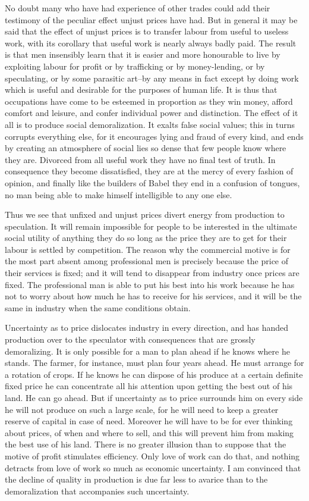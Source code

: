 \documentclass{book}
\begin{document}
No doubt many who have had experience of other trades could add their testimony of the peculiar effect unjust prices have had. But in general it may be said that the effect of unjust prices is to transfer labour from useful to useless work, with its corollary that useful work is nearly always badly paid. The result is that men insensibly learn that it is easier and more honourable to live by exploiting labour for profit or by trafficking or by money-lending, or by speculating, or by some parasitic art–by any means in fact except by doing work which is useful and desirable for the purposes of human life. It is thus that occupations have come to be esteemed in proportion as they win money, afford comfort and leisure, and confer individual power and distinction. The effect of it all is to produce social demoralization. It exalts false social values; this in turns corrupts everything else, for it encourages lying and fraud of every kind, and ends by creating an atmosphere of social lies so dense that few people know where they are. Divorced from all useful work they have no final test of truth. In consequence they become dissatisfied, they are at the mercy of every fashion of opinion, and finally like the builders of Babel they end in a confusion of tongues, no man being able to make himself intelligible to any one else.

Thus we see that unfixed and unjust prices divert energy from production to speculation. It will remain impossible for people to be interested in the ultimate social utility of anything they do so long as the price they are to get for their labour is settled by competition. The reason why the commercial motive is for the most part absent among professional men is precisely because the price of their services is fixed; and it will tend to disappear from industry once prices are fixed. The professional man is able to put his best into his work because he has not to worry about how much he has to receive for his services, and it will be the same in industry when the same conditions obtain.

Uncertainty as to price dislocates industry in every direction, and has handed production over to the speculator with consequences that are grossly demoralizing. It is only possible for a man to plan ahead if he knows where he stands. The farmer, for instance, must plan four years ahead. He must arrange for a rotation of crops. If he knows he can dispose of his produce at a certain definite fixed price he can concentrate all his attention upon getting the best out of his land. He can go ahead. But if uncertainty as to price surrounds him on every side he will not produce on such a large scale, for he will need to keep a greater reserve of capital in case of need. Moreover he will have to be for ever thinking about prices, of when and where to sell, and this will prevent him from making the best use of his land. There is no greater illusion than to suppose that the motive of profit stimulates efficiency. Only love of work can do that, and nothing detracts from love of work so much as economic uncertainty. I am convinced that the decline of quality in production is due far less to avarice than to the demoralization that accompanies such uncertainty.
\end{document}
